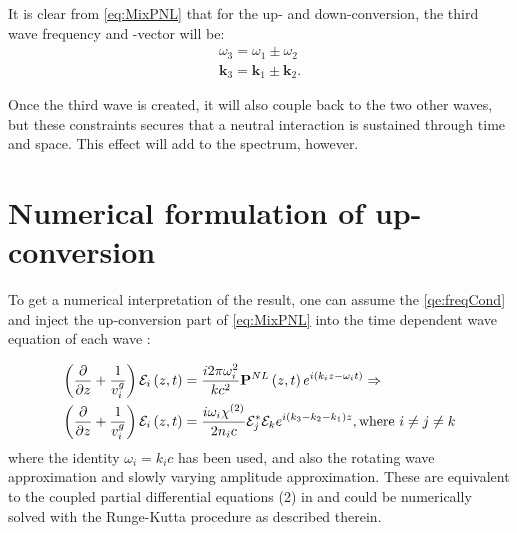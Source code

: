 It is clear from \cref{eq:MixPNL} that for the up- and down-conversion, the third wave frequency and -vector will be:
\begin{align}
  \label{qe:freqCond}
  \omega_3 = \omega_1 \pm \omega_2 \\
  \mathbf{k}_3 = \mathbf{k}_1 \pm \mathbf{k}_2.
\end{align}

Once the third wave is created, it will also couple back to
the two other waves, but these constraints secures that a neutral interaction is sustained through time and space.
This effect will add to the spectrum, however.




\section{Numerical formulation of up-conversion}
\label{sec:mixing-numeric}
 
To get a numerical interpretation of the result, one can assume the
\cref{qe:freqCond} and inject the up-conversion part of \cref{eq:MixPNL} into the time dependent wave equation of each wave \cite[Equation 3.39]{shen}:

\begin{align*}
\paren{ \pdiff{}{z}  + \frac{1}{v_i^{g}} } \mathcal{E}_i \paren{z, t}
&= \frac{i 2 \pi \omega_i^{2}}{k c^2} \mathbf{P}^{NL} \paren{z,t} e^{i \paren{k_i z - \omega_{i}
    t}} \Rightarrow \\%
\paren{ \pdiff{}{z}  + \frac{1}{v_i^{g}} } \mathcal{E}_i \paren{z, t}
&= \frac{i \omega_i \chi^{(2)}}{2 n_i c} \mathcal{E}_j^{*}\mathcal{E}_k e^{i (k_3 - k_2 -k_1) z}, \text{where } i \neq j \neq k \\
\end{align*}
where the identity $\omega_i = k_ic$ has been used, and also the rotating wave
approximation and slowly varying amplitude approximation. These are equivalent to
the coupled partial differential
equations  (2) in \cite{bakker} and could be numerically solved with the Runge-Kutta procedure
as described therein.

